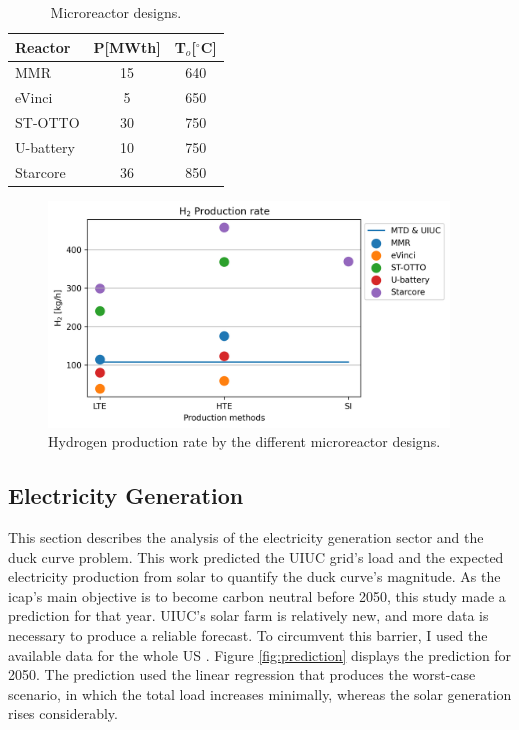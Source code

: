 	\begin{table}[htbp!]
		\centering
	    \caption{Microreactor designs.}
		\begin{tabular}{lcc}
		\toprule
		Reactor                                      & P[MWth] & T$_o$[$^\circ$C] \\
		\midrule
		MMR \cite{usnc_mmr_2019}  		             & 15      & 640              \\
		eVinci \cite{hernandez_micro_2019}           & 5       & 650              \\
		ST-OTTO \cite{harlan_x-energy_2018}          & 30      & 750              \\
		U-battery \cite{ding_design_2011}            & 10      & 750              \\
		Starcore \cite{star_core_nuclear_star_2015}  & 36      & 850              \\
		\toprule
        \end{tabular}
        \label{tab:hydro-micro}
	\end{table}

	\begin{figure}[htbp!]
	    \centering
		\includegraphics[height=6.0cm]{figures-hydro/reactors-by-hour1}
		\hfill
		\caption{Hydrogen production rate by the different microreactor designs.}
		\label{fig:hydro-micro}
	\end{figure}

\subsection{Electricity Generation}
\label{sec:results-electric}

This section describes the analysis of the electricity generation sector and the duck curve problem.
This work predicted the UIUC grid’s load and the expected electricity production from solar to quantify the duck curve’s magnitude.
As the \gls{icap}'s main objective is to become carbon neutral before 2050, this study made a prediction for that year.
UIUC's solar farm is relatively new, and more data is necessary to produce a reliable forecast.
To circumvent this barrier, I used the available data for the whole \gls{US} \cite{us_energy_information_administration_electric_2020}.
Figure \ref{fig:prediction} displays the prediction for 2050.
The prediction used the linear regression that produces the worst-case scenario, in which the total load increases minimally, whereas the solar generation rises considerably.

